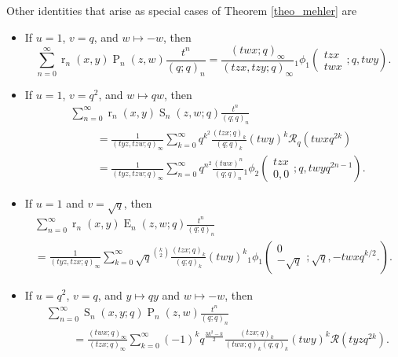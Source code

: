 \documentclass{cimart}
\DeclareMathOperator{\opE}{E}
\DeclareMathOperator{\opP}{P}
\DeclareMathOperator{\opr}{r}
\DeclareMathOperator{\opS}{S}
\begin{document}
Other identities that arise as special cases of Theorem \ref{theo_mehler} are
\begin{itemize}
    \item If $u=1$, $v=q$, and $w\mapsto-w$, then
\begin{equation}
    \sum_{n=0}^{\infty}\opr_{n}(x,y)\opP_{n}(z,w)\frac{t^n}{(q;q)_{n}}=\frac{(twx;q)_{\infty}}{(tzx,tzy;q)_{\infty}}{}_{1}\phi_{1}\left(
        \begin{array}{c}
            tzx\\
             twx
        \end{array};
        q,twy
        \right).
\end{equation}
    
    \item 
    If $u=1$, $v=q^2$, and $w\mapsto qw$, then
\begin{align}
    &\sum_{n=0}^{\infty}\opr_{n}(x,y)\opS_{n}(z,w;q)\frac{t^n}{(q;q)_{n}}\nonumber\\
    &\hspace{1cm}=\frac{1}{(tyz,tzw;q)_{\infty}}\sum_{k=0}^{\infty}q^{k^2}\frac{(tzx;q)_{k}}{(q;q)_{k}}(twy)^k\mathcal{R}_{q}(twxq^{2k})\\
    &\hspace{1cm}=\frac{1}{(tyz,tzw;q)_{\infty}}\sum_{n=0}^{\infty}q^{n^2}\frac{(twx)^n}{(q;q)_{n}}{}_{1}\phi_{2}\left(
        \begin{array}{c}
            tzx\\
             0,0
        \end{array};
        q,twyq^{2n-1}
        \right).
\end{align}

    \item If $u=1$ and $v=\sqrt{q}$, then
    \begin{multline}
    \sum_{n=0}^{\infty}\opr_{n}(x,y)\opE_{n}(z,w;q)\frac{t^n}{(q;q)_{n}}\\
    =\frac{1}{(tyz,tzx;q)_{\infty}}\sum_{k=0}^{\infty}\sqrt{q}^{\binom{k}{2}}\frac{(tzx;q)_{k}}{(q;q)_{k}}(twy)^k{}_{1}\phi_{1}\left(
        \begin{array}{c}
            0\\
             -\sqrt{q}
        \end{array};
        \sqrt{q},-twxq^{k/2}.
        \right).
\end{multline}
    \item 
    If $u=q^2$, $v=q$, and $y\mapsto qy$ and $w\mapsto-w$, then
    \begin{align}
        &\sum_{n=0}^{\infty}\opS_{n}(x,y;q)\opP_{n}(z,w)\frac{t^n}{(q;q)_{n}}\nonumber\\
        &\hspace{1cm}=\frac{(twx;q)_{\infty}}{(tzx;q)_{\infty}}\sum_{k=0}^{\infty}(-1)^kq^{\frac{3k^2-k}{2}}\frac{(tzx;q)_{k}}{(twx;q)_{k}(q;q)_{k}}(twy)^k\mathcal{R}(tyzq^{2k}).
    \end{align}
    

\end{itemize}
\end{document}
